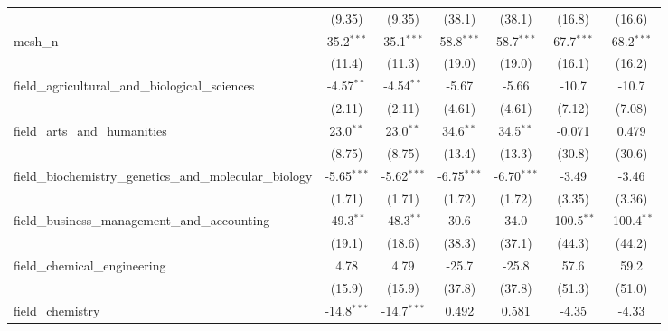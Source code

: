 \begin{tabular}{lcccccc}
                                                               & (9.35)         & (9.35)         & (38.1)        & (38.1)        & (16.8)        & (16.6)\\   
   mesh\_n                                                     & 35.2$^{***}$   & 35.1$^{***}$   & 58.8$^{***}$  & 58.7$^{***}$  & 67.7$^{***}$  & 68.2$^{***}$\\   
                                                               & (11.4)         & (11.3)         & (19.0)        & (19.0)        & (16.1)        & (16.2)\\   
   field\_agricultural\_and\_biological\_sciences              & -4.57$^{**}$   & -4.54$^{**}$   & -5.67         & -5.66         & -10.7         & -10.7\\   
                                                               & (2.11)         & (2.11)         & (4.61)        & (4.61)        & (7.12)        & (7.08)\\   
   field\_arts\_and\_humanities                                & 23.0$^{**}$    & 23.0$^{**}$    & 34.6$^{**}$   & 34.5$^{**}$   & -0.071        & 0.479\\   
                                                               & (8.75)         & (8.75)         & (13.4)        & (13.3)        & (30.8)        & (30.6)\\   
   field\_biochemistry\_genetics\_and\_molecular\_biology      & -5.65$^{***}$  & -5.62$^{***}$  & -6.75$^{***}$ & -6.70$^{***}$ & -3.49         & -3.46\\   
                                                               & (1.71)         & (1.71)         & (1.72)        & (1.72)        & (3.35)        & (3.36)\\   
   field\_business\_management\_and\_accounting                & -49.3$^{**}$   & -48.3$^{**}$   & 30.6          & 34.0          & -100.5$^{**}$ & -100.4$^{**}$\\   
                                                               & (19.1)         & (18.6)         & (38.3)        & (37.1)        & (44.3)        & (44.2)\\   
   field\_chemical\_engineering                                & 4.78           & 4.79           & -25.7         & -25.8         & 57.6          & 59.2\\   
                                                               & (15.9)         & (15.9)         & (37.8)        & (37.8)        & (51.3)        & (51.0)\\   
   field\_chemistry                                            & -14.8$^{***}$  & -14.7$^{***}$  & 0.492         & 0.581         & -4.35         & -4.33\\   

\end{tabular}
